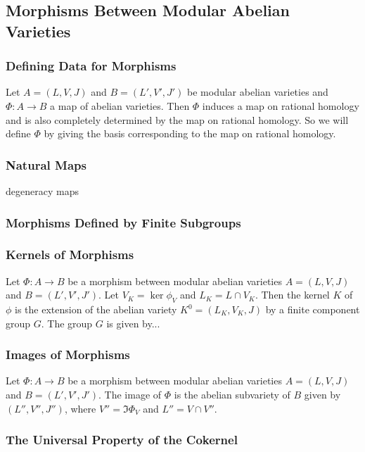 \documentclass{article}
\begin{document}
\subsection{Morphisms Between Modular Abelian Varieties}



\subsubsection{Defining Data for Morphisms}

Let $A=(L, V, J)$ and $B=(L', V', J')$ be modular abelian varieties and
$\Phi:A\to B$ a map of abelian varieties. Then $\Phi$ induces a map on rational
homology and is also completely determined by the map on rational homology.
So we will define $\Phi$ by giving the basis corresponding to the map on
rational homology.

\subsubsection{Natural Maps}

degeneracy maps

\subsubsection{Morphisms Defined by Finite Subgroups}

\subsubsection{Kernels of Morphisms}\label{sec:kernelmodabvar}

Let $\Phi:A\to B$ be a morphism between modular abelian varieties $A=(L, V, J)$
and $B=(L', V', J')$. Let $V_K=\ker \phi_V$ and $L_K=L\cap V_K$. Then the
kernel $K$ of $\phi$ is the extension of the abelian variety $K^0 = (L_K, V_K,
J)$ by a finite component group $G$. The group $G$ is given by...

\subsubsection{Images of Morphisms}

Let $\Phi:A\to B$ be a morphism between modular abelian varieties $A=(L, V, J)$
and $B=(L', V', J')$. The image of $\Phi$ is the abelian subvariety of $B$
given by $(L'', V'', J'')$, where $V''=\Im \Phi_V$ and $L''=V\cap V''$.

\subsubsection{The Universal Property of the Cokernel}
\end{document}
